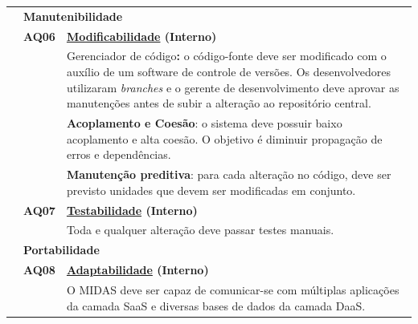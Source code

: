 \documentclass[11pt,a4paper]{article}
\begin{document}
\begin{table}[htb]
\begin{tabular*}{\linewidth}{@{\extracolsep{\fill}}|r r p{12.5cm}|}
& \multicolumn{2}{l|}{\textbf{Manutenibilidade}} \\ \cline{2-3}

&\textbf{AQ06} & \textbf{\underline{Modificabilidade} (Interno)}\\ 
& & Gerenciador de código\textbf{:} o código-fonte deve ser modificado com o auxílio de um software de controle de versões. Os desenvolvedores utilizaram \textit{branches} e o gerente de desenvolvimento deve aprovar as manutenções antes de subir a alteração ao repositório central. \\&
&\textbf{Acoplamento e Coesão}: o sistema deve possuir baixo acoplamento e alta coesão. O objetivo é diminuir propagação de erros e dependências. \\&
&\textbf{Manutenção preditiva}: para cada alteração no código, deve ser previsto unidades que devem ser modificadas em conjunto.  \\ \cline{2-3}
 
&\textbf{AQ07} & \textbf{\underline{Testabilidade} (Interno)}\\ 
& &  Toda e qualquer alteração deve passar testes manuais. \\\cline{1-3}

& \multicolumn{2}{l|}{\textbf{Portabilidade}} \\ \cline{2-3}

&\textbf{AQ08} & \textbf{\underline{Adaptabilidade} (Interno)}\\ 
& &  O MIDAS deve ser capaz de comunicar-se com múltiplas aplicações da camada SaaS e diversas bases de dados da camada DaaS. \\\cline{1-3}

\end{tabular*}
\end{table}






\end{document}
